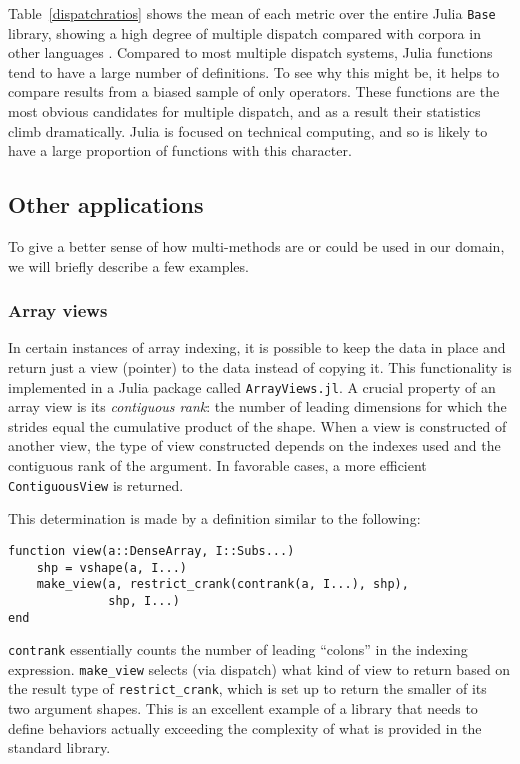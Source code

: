 \documentclass[preprint]{sigplanconf}
\newcommand{\code}[1]{\texttt{#1}}
\begin{document}
Table~\ref{dispatchratios} shows the mean of each metric over the entire Julia
\code{Base} library, showing a high degree of multiple dispatch compared with
corpora in other languages \cite{Muschevici:2008}.
Compared to most multiple dispatch systems, Julia functions tend to have a large
number of definitions. To see why this might be, it helps to compare results
from a biased sample of only operators. These functions are the most obvious
candidates for multiple dispatch, and as a result their statistics climb
dramatically. Julia is focused on technical computing, and so is likely to
have a large proportion of functions with this character.

\subsection{Other applications}

To give a better sense of how multi-methods
are or could be used in our domain, we will briefly describe a few examples.

\subsubsection{Array views}

In certain instances of array indexing, it is
possible to keep the data in place and return just a view (pointer) to the
data instead of copying it. This functionality is implemented in a Julia
package called \code{ArrayViews.jl}\cite{Lin:2014av}. A crucial property
of an array view is its \emph{contiguous rank}: the number of leading
dimensions for which the strides equal the cumulative product of the shape.
When a view is constructed of another view, the type of view constructed
depends on the indexes used and the contiguous rank of the argument. In
favorable cases, a more efficient \code{ContiguousView} is returned.

This determination is made by a definition similar to the following:

\begin{minipage}{\linewidth}
{\small
\begin{verbatim}
function view(a::DenseArray, I::Subs...)
    shp = vshape(a, I...)
    make_view(a, restrict_crank(contrank(a, I...), shp),
              shp, I...)
end

\end{verbatim}
}
\end{minipage}

\code{contrank} essentially counts the number of leading ``colons'' in the
indexing expression. \code{make\_view} selects (via dispatch) what kind of
view to return based on the result type of \code{restrict\_crank}, which is
set up to return the smaller of its two argument shapes.
This is an excellent example of a library that needs to define behaviors
actually exceeding the complexity of what is provided in the standard library.
\end{document}
